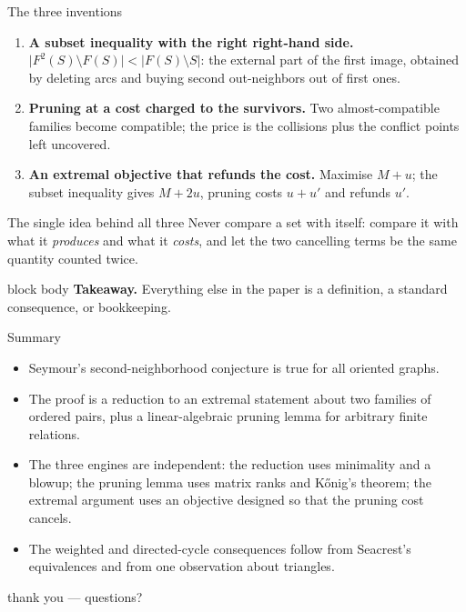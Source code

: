 \documentclass[aspectratio=169,11pt]{beamer}
\newcommand{\abs}[1]{\lvert #1\rvert}
\newcommand{\takeaway}[1]{%
  \vfill
  \begin{beamercolorbox}[wd=\dimexpr\textwidth-9pt\relax,sep=4pt,rounded=true]{block body}
    \footnotesize\color{mainblue}\textbf{Takeaway.} \color{black}#1
  \end{beamercolorbox}}
\begin{document}
\begin{frame}{The three inventions}
  \begin{enumerate}
    \item \textbf{A subset inequality with the right right-hand side.}
      $\abs{F^2(S)\setminus F(S)}<\abs{F(S)\setminus S}$: the external part of the first image,
      obtained by deleting arcs and buying second out-neighbors out of first ones.
    \item \textbf{Pruning at a cost charged to the survivors.}
      Two almost-compatible families become compatible; the price is the collisions plus the
      conflict points left uncovered.
    \item \textbf{An extremal objective that refunds the cost.}
      Maximise $M+u$; the subset inequality gives $M+2u$, pruning costs $u+u'$ and refunds $u'$.
  \end{enumerate}
  \medskip
  \begin{block}{The single idea behind all three}
    Never compare a set with itself: compare it with what it \emph{produces} and what it
    \emph{costs}, and let the two cancelling terms be the same quantity counted twice.
  \end{block}
  \takeaway{Everything else in the paper is a definition, a standard consequence, or bookkeeping.}
\end{frame}

\begin{frame}{Summary}
  \small
  \begin{itemize}
    \item Seymour's second-neighborhood conjecture is true for all oriented graphs.
    \item The proof is a reduction to an extremal statement about two families of ordered pairs,
      plus a linear-algebraic pruning lemma for arbitrary finite relations.
    \item The three engines are independent: the reduction uses minimality and a blowup; the
      pruning lemma uses matrix ranks and K\H{o}nig's theorem; the extremal argument uses an
      objective designed so that the pruning cost cancels.
    \item The weighted and directed-cycle consequences follow from Seacrest's equivalences and from
      one observation about triangles.
  \end{itemize}
  \vfill
  \begin{center}\small\color{mainblue}
    thank you --- questions?
  \end{center}
\end{frame}
\end{document}
